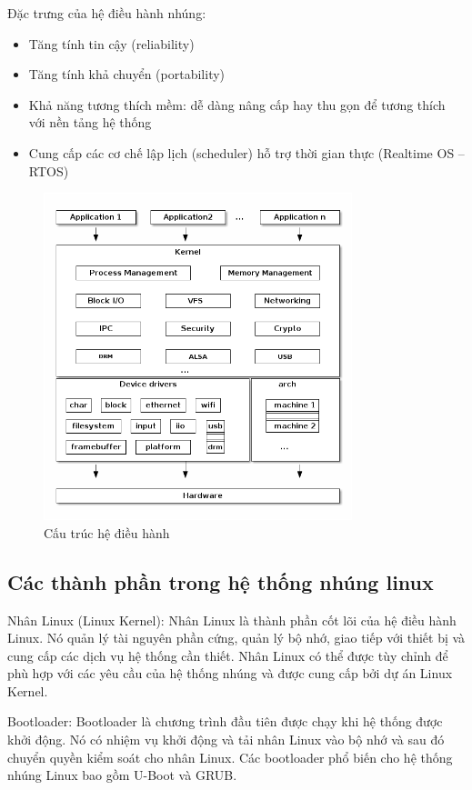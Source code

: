 \documentclass{report}
\begin{document}
Đặc trưng của hệ điều hành nhúng:
\begin{itemize}
	\item Tăng tính tin cậy (reliability)
	\item Tăng tính khả chuyển (portability)
	\item Khả năng tương thích mềm: dễ dàng nâng cấp hay thu gọn để tương thích với nền tảng hệ thống
	\item Cung cấp các cơ chế lập lịch (scheduler) hỗ trợ thời gian thực (Realtime OS – RTOS)
\end{itemize}
\begin{figure}[H]
	\centering
	\includegraphics[width=0.8\textwidth]{../images/cau-truc-linux.png}
	\caption{Cấu trúc hệ điều hành}
\end{figure}

\subsection{Các thành phần trong hệ thống nhúng linux}
Nhân Linux (Linux Kernel): Nhân Linux là thành phần cốt lõi của hệ điều hành Linux. Nó quản lý tài nguyên phần cứng, quản lý bộ nhớ, giao tiếp với thiết bị và cung cấp các dịch vụ hệ thống cần thiết. Nhân Linux có thể được tùy chỉnh để phù hợp với các yêu cầu của hệ thống nhúng và được cung cấp bởi dự án Linux Kernel.

Bootloader: Bootloader là chương trình đầu tiên được chạy khi hệ thống được khởi động. Nó có nhiệm vụ khởi động và tải nhân Linux vào bộ nhớ và sau đó chuyển quyền kiểm soát cho nhân Linux. Các bootloader phổ biến cho hệ thống nhúng Linux bao gồm U-Boot và GRUB.
\end{document}
